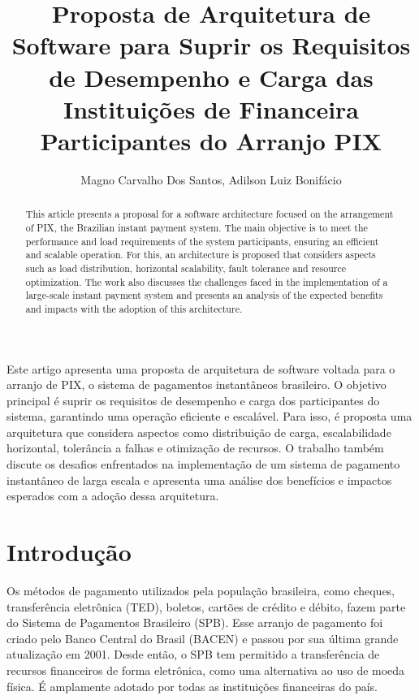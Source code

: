 \documentclass[12pt]{article}
\title{Proposta de Arquitetura de Software para Suprir os Requisitos de Desempenho e Carga das Instituições de Financeira Participantes do Arranjo PIX}
\author{Magno Carvalho Dos Santos\inst{1}, Adilson Luiz Bonifácio\inst{1}}
\begin{document}
 

\maketitle

\begin{abstract}
  This article presents a proposal for a software architecture focused on the arrangement of PIX, the Brazilian instant payment system. The main objective is to meet the performance and load requirements of the system participants, ensuring an efficient and scalable operation. For this, an architecture is proposed that considers aspects such as load distribution, horizontal scalability, fault tolerance and resource optimization. The work also discusses the challenges faced in the implementation of a large-scale instant payment system and presents an analysis of the expected benefits and impacts with the adoption of this architecture.
\end{abstract}
     
\begin{resumo} 
  Este artigo apresenta uma proposta de arquitetura de software voltada para o arranjo de PIX, o sistema de pagamentos instantâneos brasileiro. O objetivo principal é suprir os requisitos de desempenho e carga dos participantes do sistema, garantindo uma operação eficiente e escalável. Para isso, é proposta uma arquitetura que considera aspectos como distribuição de carga, escalabilidade horizontal, tolerância a falhas e otimização de recursos. O trabalho também discute os desafios enfrentados na implementação de um sistema de pagamento instantâneo de larga escala e apresenta uma análise dos benefícios e impactos esperados com a adoção dessa arquitetura. 
\end{resumo}


\section{Introdução}

Os métodos de pagamento utilizados pela população brasileira, como cheques, transferência eletrônica (TED), boletos, cartões de crédito e débito, fazem parte do Sistema de Pagamentos Brasileiro (SPB). Esse arranjo de pagamento foi criado pelo Banco Central do Brasil (BACEN) e passou por sua última grande atualização em 2001. Desde então, o SPB tem permitido a transferência de recursos financeiros de forma eletrônica, como uma alternativa ao uso de moeda física. É amplamente adotado por todas as instituições financeiras do país.
\end{document}
